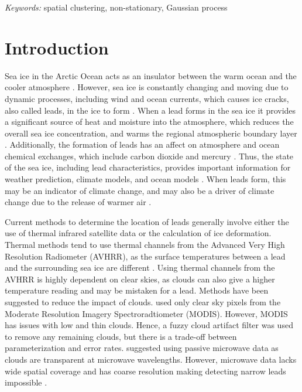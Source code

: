 \documentclass[12pt]{article}
\begin{document}
\noindent%
{\it Keywords:} spatial clustering, non-stationary, Gaussian process
\vfill

\newpage
{} %

\hypertarget{intro}{%
\section{Introduction}\label{intro}}

Sea ice in the Arctic Ocean acts as an insulator between the warm ocean
and the cooler atmosphere \citep{peterson_evaluating_2011}. However, sea
ice is constantly changing and moving due to dynamic processes,
including wind and ocean currents, which causes ice cracks, also called
leads, in the ice to form
\citep{peterson_evaluating_2011, hoffman_detection_2019, hutter_leads_2019}.
When a lead forms in the sea ice it provides a significant source of
heat and moisture into the atmosphere, which reduces the overall sea ice
concentration, and warms the regional atmospheric boundary layer
\citep{key_detectability_1993, reiser_new_2020}. Additionally, the
formation of leads has an affect on atmosphere and ocean chemical
exchanges, which include carbon dioxide and mercury
\citep{hoffman_detection_2019}. Thus, the state of the sea ice,
including lead characteristics, provides important information for
weather prediction, climate models, and ocean models
\citep{reiser_new_2020}. When leads form, this may be an indicator of
climate change, and may also be a driver of climate change due to the
release of warmer air \citep{peterson_evaluating_2011}.

Current methods to determine the location of leads generally involve
either the use of thermal infrared satellite data or the calculation of
ice deformation. Thermal methods tend to use thermal channels from the
Advanced Very High Resolution Radiometer (AVHRR), as the surface
temperatures between a lead and the surrounding sea ice are different
\citep{key_detectability_1993}. Using thermal channels from the AVHRR is
highly dependent on clear skies, as clouds can also give a higher
temperature reading and may be mistaken for a lead. Methods have been
suggested to reduce the impact of clouds.
\citet{willmes_pan-arctic_2015} used only clear sky pixels from the
Moderate Resolution Imagery Spectroradtiometer (MODIS). However, MODIS
has issues with low and thin clouds. Hence, a fuzzy cloud artifact
filter was used to remove any remaining clouds, but there is a trade-off
between parameterization and error rates. \citet{rohrs_algorithm_2012}
suggested using passive microwave data as clouds are transparent at
microwave wavelengths. However, microwave data lacks wide spatial
coverage and has coarse resolution making detecting narrow leads
impossible \citep{hoffman_detection_2019}.
\end{document}
